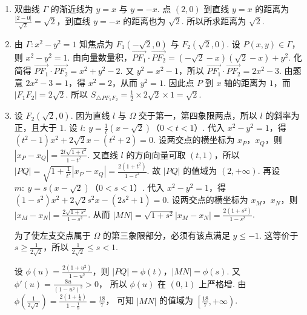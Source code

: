 \documentclass[UTF8,a4paper,oneside,11pt]{ctexbook}
\begin{document}
\begin{solution}
\begin{enumerate}
\item 双曲线 \( \Gamma \) 的渐近线为 \( y=x \) 与 \( y=-x \).
点 \( \left( 2,0 \right) \) 到直线 \( y=x \) 的距离为 \( \frac{\left| 2-0 \right|}{\sqrt{2}}=\sqrt{2} \)，到直线 \( y=-x \) 的距离也为 \( \sqrt{2} \). 所以所求距离为 \( \sqrt{2} \).

\item 由 \( \Gamma:x^2-y^2=1 \) 知焦点为 \( F_1\left( -\sqrt{2},0 \right) \) 与 \( F_2\left( \sqrt{2},0 \right) \).
设 \( P\left( x,y \right)\in \Gamma \)，则 \( x^2-y^2=1 \).
由向量数量积，\( \overrightarrow{PF_1}\cdot \overrightarrow{PF_2}=\left( -\sqrt{2}-x \right)\left( \sqrt{2}-x \right)+y^2 \). 化简得 \( \overrightarrow{PF_1}\cdot \overrightarrow{PF_2}=x^2+y^2-2 \). 又 \( y^2=x^2-1 \)，所以 \( \overrightarrow{PF_1}\cdot \overrightarrow{PF_2}=2x^2-3 \).
由题意 \( 2x^2-3=1 \)，得 \( x^2=2 \)，从而 \( y^2=1 \). 因此点 \(P\) 到 \( x \) 轴的距离为 \( 1 \)，而 \( \left| F_1F_2 \right|=2\sqrt{2} \). 所以 \( S_{\triangle PF_1F_2}=\frac{1}{2}\times 2\sqrt{2}\times 1=\sqrt{2} \).

\item 设 \( F_2\left( \sqrt{2},0 \right) \).
因为直线 \( l \) 与 \( \Omega \) 交于第一，第四象限两点，所以 \( l \) 的斜率为正，且大于 \( 1 \). 设 \( l:\ y=\frac{1}{t}\left( x-\sqrt{2} \right) \)（\( 0<t<1 \)）. 代入 \( x^2-y^2=1 \)，得 \( \left( t^2-1 \right)x^2+2\sqrt{2}x-\left( t^2+2 \right)=0 \). 设两交点的横坐标为 \( x_P \)，\( x_Q \)，则 \( \left| x_P-x_Q \right|=\frac{2t\sqrt{1+t^2}}{1-t^2} \). 又直线 \( l \) 的方向向量可取 \( \left( t,1 \right) \)，所以 \( \left| PQ \right|=\sqrt{1+\frac{1}{t^2}}\left| x_P-x_Q \right|=\frac{2\left( 1+t^2 \right)}{1-t^2} \).
故 \( \left| PQ \right| \) 的值域为 \( \left( 2,+\infty \right) \).
再设 \( m:\ y=s\left( x-\sqrt{2} \right) \)（\( 0<s<1 \)）. 代入 \( x^2-y^2=1 \)，得 \( \left( 1-s^2 \right)x^2+2\sqrt{2}s^2x-\left( 2s^2+1 \right)=0 \). 设两交点的横坐标为 \( x_M \)，\( x_N \)，则 \( \left| x_M-x_N \right|=\frac{2\sqrt{1+s^2}}{1-s^2} \). 从而 \( \left| MN \right|=\sqrt{1+s^2}\left| x_M-x_N \right|=\frac{2\left( 1+s^2 \right)}{1-s^2} \).

为了使左支交点属于 \( \Omega \) 的第三象限部分，必须有该点满足 \( y\le -1 \). 这等价于 \( s\ge \frac{1}{2\sqrt{2}} \)，所以 \( \frac{1}{2\sqrt{2}}\le s<1 \).

设 \( \phi(u)=\frac{2\left( 1+u^2 \right)}{1-u^2} \)，则 \( \left| PQ \right|=\phi(t) \)，\( \left| MN \right|=\phi(s) \). 又 \( \phi'(u)=\frac{8u}{\left( 1-u^2 \right)^2}>0 \)，
所以 \( \phi(u) \) 在 \( \left( 0,1 \right) \) 上严格增.
由 \( \phi\left( \frac{1}{2\sqrt{2}} \right)=\frac{2\left( 1+\frac{1}{8} \right)}{1-\frac{1}{8}}=\frac{18}{7} \)，
可知 \( \left| MN \right| \) 的值域为 \( \left[ \frac{18}{7},+\infty \right) \).


\end{enumerate}
\end{solution}
\end{document}
